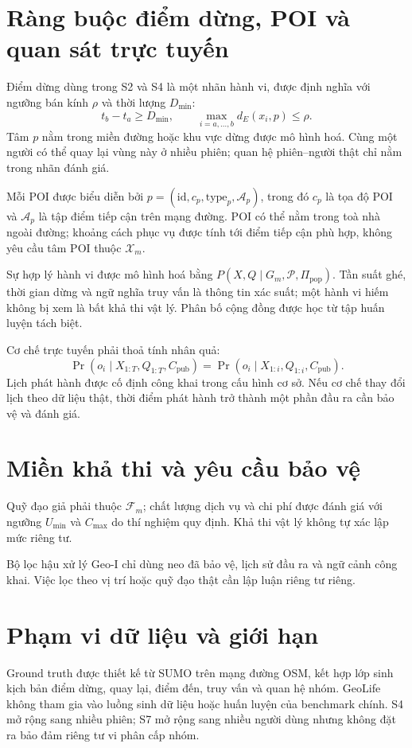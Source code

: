 \documentclass[12pt,a4paper,oneside]{report}
\begin{document}
\section{Ràng buộc điểm dừng, POI và quan sát trực tuyến}

Điểm dừng dùng trong S2 và S4 là một nhãn hành vi, được định nghĩa với ngưỡng bán kính $\rho$ và thời lượng $D_{\min}$:
\[
t_b-t_a\ge D_{\min},\qquad
\max_{i=a,\ldots,b} d_E(x_i,p)\le\rho.
\]
Tâm $p$ nằm trong miền đường hoặc khu vực dừng được mô hình hoá. Cùng một người có thể quay lại vùng này ở nhiều phiên; quan hệ phiên--người thật chỉ nằm trong nhãn đánh giá.

Mỗi POI được biểu diễn bởi $p=(\mathrm{id},c_p,\mathrm{type}_p,\mathcal A_p)$, trong đó $c_p$ là tọa độ POI và $\mathcal A_p$ là tập điểm tiếp cận trên mạng đường. POI có thể nằm trong toà nhà ngoài đường; khoảng cách phục vụ được tính tới điểm tiếp cận phù hợp, không yêu cầu tâm POI thuộc $\mathcal X_m$.

Sự hợp lý hành vi được mô hình hoá bằng $P(X,Q\mid G_m,\mathcal P,\Pi_{\mathrm{pop}})$. Tần suất ghé, thời gian dừng và ngữ nghĩa truy vấn là thông tin xác suất; một hành vi hiếm không bị xem là bất khả thi vật lý. Phân bố cộng đồng được học từ tập huấn luyện tách biệt.

Cơ chế trực tuyến phải thoả tính nhân quả:
\[
\Pr(o_i\mid X_{1:T},Q_{1:T},C_{\mathrm{pub}})
=\Pr(o_i\mid X_{1:i},Q_{1:i},C_{\mathrm{pub}}).
\]
Lịch phát hành được cố định công khai trong cấu hình cơ sở. Nếu cơ chế thay đổi lịch theo dữ liệu thật, thời điểm phát hành trở thành một phần đầu ra cần bảo vệ và đánh giá.

\section{Miền khả thi và yêu cầu bảo vệ}

Quỹ đạo giả phải thuộc $\mathcal F_m$; chất lượng dịch vụ và chi phí được đánh giá với ngưỡng $U_{\min}$ và $C_{\max}$ do thí nghiệm quy định. Khả thi vật lý không tự xác lập mức riêng tư.

Bộ lọc hậu xử lý Geo-I chỉ dùng neo đã bảo vệ, lịch sử đầu ra và ngữ cảnh công khai. Việc lọc theo vị trí hoặc quỹ đạo thật cần lập luận riêng tư riêng.

\section{Phạm vi dữ liệu và giới hạn}

Ground truth được thiết kế từ SUMO trên mạng đường OSM, kết hợp lớp sinh kịch bản điểm dừng, quay lại, điểm đến, truy vấn và quan hệ nhóm. GeoLife không tham gia vào luồng sinh dữ liệu hoặc huấn luyện của benchmark chính. S4 mở rộng sang nhiều phiên; S7 mở rộng sang nhiều người dùng nhưng không đặt ra bảo đảm riêng tư vi phân cấp nhóm.
\end{document}
